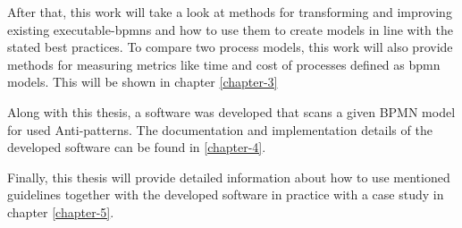 After that, this work will take a look at methods for transforming and improving existing \gls{executable-bpmn}s and how to use them to create models in line with the stated best practices. To compare two process models, this work will also provide methods for measuring metrics like time and cost of processes defined as \gls{bpmn} models. This will be shown in chapter \ref{chapter-3}

Along with this thesis, a software was developed that scans a given BPMN model for used Anti-patterns. The documentation and implementation details of the developed software can be found in \ref{chapter-4}.  

Finally, this thesis will provide detailed information about how to use mentioned guidelines together with the developed software in practice with a case study in chapter \ref{chapter-5}.